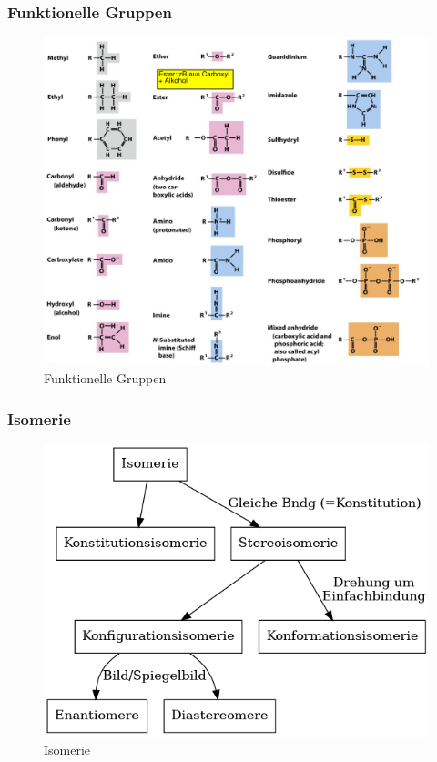 \documentclass[a4paper,twocolumn,english,fontsize=7,DIV=16]{scrartcl}
\begin{document}
\subsubsection{Funktionelle Gruppen}

\begin{figure}[h]
	\centering
	\includegraphics[width=\linewidth]{img/funktionale_gruppen.png}
	\caption{Funktionelle Gruppen}
\end{figure}

\subsubsection{Isomerie}

\begin{figure}[h]
	\centering
	\includegraphics[width=\linewidth]{graphs/isomerie.png}
	\caption{Isomerie}
\end{figure}
\end{document}
